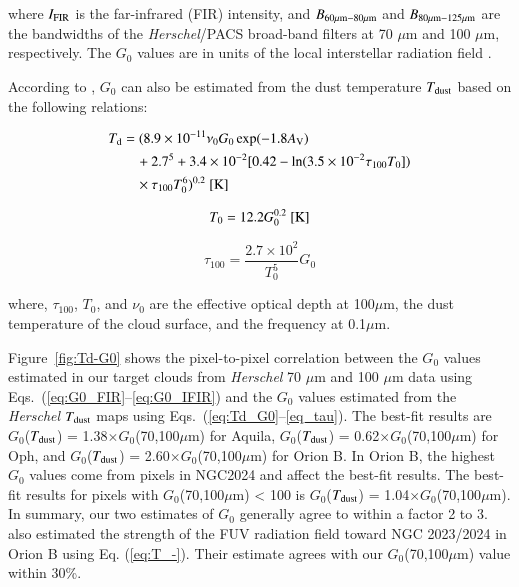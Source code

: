 \documentclass{aa}
\begin{document}
{\noindent where $I_{\rm FIR}$ is the far-infrared (FIR) intensity, and $B_{\rm 60 \mu m - 80 \mu m}$ and $B_{\rm 80 \mu m - 125 \mu m}$ are
the bandwidths of the {\it Herschel}/PACS broad-band filters at 70 $\mu$m and 100 $\mu$m, respectively. 
{The $G_0$ values are in units of the local interstellar radiation field \citep{Habing68}.}

According to \citet{Hollenbach91}, $G_0$ can also be estimated from 
the dust temperature $T_{\rm dust}$ based on the following relations: 



\begin{equation}\label{eq:Td_G0}
\begin{split}
T_{\rm d} & = (8.9 \times 10^{-11} \nu_0 G_0 \exp(-1.8 A_{\rm V}) \\
&\quad + 2.7^5 + 3.4 \times 10^{-2} [0.42 - \ln(3.5 \times 10^{-2} \tau_{100} T_0])\\
&\quad \times \tau_{100} T_0^6)^{0.2}\  [{\rm K}]
\end{split}
\end{equation}

\begin{equation}\label{eq:T_-}
T_0 = 12.2 G_0^{0.2} \   [{\rm K}]
\end{equation}

\begin{equation}\label{eq_tau}
\tau_{100} = \frac{2.7 \times 10^2}{T_0^5} G_0
\end{equation}

\noindent where, $\tau_{100}$, $T_{0}$, and $\nu_0$ are the effective optical depth at 100$\mu$m, the dust temperature of the cloud surface, and the frequency at 0.1$\mu$m.


Figure~\ref{fig:Td-G0} shows the pixel-to-pixel correlation between the $G_0$ values estimated 
in our target clouds from {\it Herschel} 70 $\mu$m and 100 $\mu$m data using Eqs.~(\ref{eq:G0_FIR}--\ref{eq:G0_IFIR}) 
and the $G_0$ values estimated from the  {\it Herschel} $T_{\rm dust}$ maps 
using Eqs.~(\ref{eq:Td_G0}--\ref{eq_tau}). 
{
The best-fit results are $G_0$($T_{\rm dust}$) = 1.38$\times$$G_0$(70,100$\mu$m) for Aquila,  $G_0$($T_{\rm dust}$) = 0.62$\times$$G_0$(70,100$\mu$m) for Oph, and  $G_0$($T_{\rm dust}$) = 2.60$\times$$G_0$(70,100$\mu$m) for Orion B.  In Orion B, the highest $G_0$ values come from pixels in NGC2024 and affect the best-fit results. 
The best-fit results for pixels with $G_0$(70,100$\mu$m) < 100 is $G_0$($T_{\rm dust}$) = 1.04$\times$$G_0$(70,100$\mu$m).  
In summary, our two estimates of $G_0$ generally agree to within a factor 2 to 3. }
{\citet{Pety16} also estimated the strength of the FUV radiation field 
toward NGC 2023/2024 in Orion B 
using Eq. (\ref{eq:T_-}).  {Their estimate agrees with our $G_0$(70,100$\mu$m) value  within 30\%}.}

}
\end{document}
